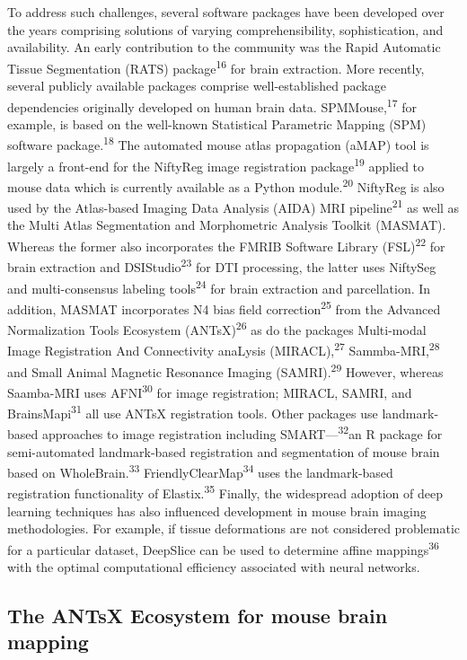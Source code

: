 \documentclass[
  12pt,
]{article}
\begin{document}
To address such challenges, several software packages have been
developed over the years comprising solutions of varying
comprehensibility, sophistication, and availability. An early
contribution to the community was the Rapid Automatic Tissue
Segmentation (RATS) package\textsuperscript{16} for brain extraction.
More recently, several publicly available packages comprise
well-established package dependencies originally developed on human
brain data. SPMMouse,\textsuperscript{17} for example, is based on the
well-known Statistical Parametric Mapping (SPM) software
package.\textsuperscript{18} The automated mouse atlas propagation
(aMAP) tool is largely a front-end for the NiftyReg image registration
package\textsuperscript{19} applied to mouse data which is currently
available as a Python module.\textsuperscript{20} NiftyReg is also used
by the Atlas-based Imaging Data Analysis (AIDA) MRI
pipeline\textsuperscript{21} as well as the Multi Atlas Segmentation and
Morphometric Analysis Toolkit (MASMAT). Whereas the former also
incorporates the FMRIB Software Library (FSL)\textsuperscript{22} for
brain extraction and DSIStudio\textsuperscript{23} for DTI processing,
the latter uses NiftySeg and multi-consensus labeling
tools\textsuperscript{24} for brain extraction and parcellation. In
addition, MASMAT incorporates N4 bias field
correction\textsuperscript{25} from the Advanced Normalization Tools
Ecosystem (ANTsX)\textsuperscript{26} as do the packages Multi-modal
Image Registration And Connectivity anaLysis
(MIRACL),\textsuperscript{27} Sammba-MRI,\textsuperscript{28} and Small
Animal Magnetic Resonance Imaging (SAMRI).\textsuperscript{29} However,
whereas Saamba-MRI uses AFNI\textsuperscript{30} for image registration;
MIRACL, SAMRI, and BrainsMapi\textsuperscript{31} all use ANTsX
registration tools. Other packages use landmark-based approaches to
image registration including SMART---\textsuperscript{32}an R package
for semi-automated landmark-based registration and segmentation of mouse
brain based on WholeBrain.\textsuperscript{33}
FriendlyClearMap\textsuperscript{34} uses the landmark-based
registration functionality of Elastix.\textsuperscript{35} Finally, the
widespread adoption of deep learning techniques has also influenced
development in mouse brain imaging methodologies. For example, if tissue
deformations are not considered problematic for a particular dataset,
DeepSlice can be used to determine affine mappings\textsuperscript{36}
with the optimal computational efficiency associated with neural
networks.

\hypertarget{the-antsx-ecosystem-for-mouse-brain-mapping}{%
\subsection{The ANTsX Ecosystem for mouse brain
mapping}\label{the-antsx-ecosystem-for-mouse-brain-mapping}}
\end{document}
